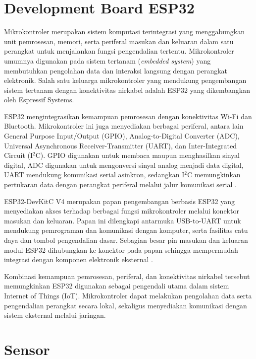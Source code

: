 \section{Development Board ESP32}
\label{sec:esp32}

Mikrokontroler merupakan sistem komputasi terintegrasi yang menggabungkan unit pemrosesan, memori, serta periferal masukan dan keluaran dalam satu perangkat untuk menjalankan fungsi pengendalian tertentu. Mikrokontroler umumnya digunakan pada sistem tertanam (\textit{embedded system}) yang membutuhkan pengolahan data dan interaksi langsung dengan perangkat elektronik. Salah satu keluarga mikrokontroler yang mendukung pengembangan sistem tertanam dengan konektivitas nirkabel adalah ESP32 yang dikembangkan oleh Espressif Systems.

ESP32 mengintegrasikan kemampuan pemrosesan dengan konektivitas Wi-Fi dan Bluetooth. Mikrokontroler ini juga menyediakan berbagai periferal, antara lain General Purpose Input/Output (GPIO), Analog-to-Digital Converter (ADC), Universal Asynchronous Receiver-Transmitter (UART), dan Inter-Integrated Circuit (I$^2$C). GPIO digunakan untuk membaca maupun menghasilkan sinyal digital, ADC digunakan untuk mengonversi sinyal analog menjadi data digital, UART mendukung komunikasi serial asinkron, sedangkan I$^2$C memungkinkan pertukaran data dengan perangkat periferal melalui jalur komunikasi serial \cite{espressif_esp32}.

ESP32-DevKitC V4 merupakan papan pengembangan berbasis ESP32 yang menyediakan akses terhadap berbagai fungsi mikrokontroler melalui konektor masukan dan keluaran. Papan ini dilengkapi antarmuka USB-to-UART untuk mendukung pemrograman dan komunikasi dengan komputer, serta fasilitas catu daya dan tombol pengendalian dasar. Sebagian besar pin masukan dan keluaran modul ESP32 dihubungkan ke konektor pada papan sehingga mempermudah integrasi dengan komponen elektronik eksternal \cite{esp32_devkitc_v4}.

Kombinasi kemampuan pemrosesan, periferal, dan konektivitas nirkabel tersebut memungkinkan ESP32 digunakan sebagai pengendali utama dalam sistem Internet of Things (IoT). Mikrokontroler dapat melakukan pengolahan data serta pengendalian perangkat secara lokal, sekaligus menyediakan komunikasi dengan sistem eksternal melalui jaringan.


\section{Sensor}
\label{sec:Sensor}

